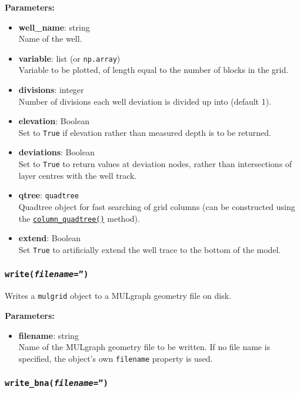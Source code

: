 \textbf{Parameters:}
\begin{itemize}
\item \textbf{well\_name}: string\\
  Name of the well.
\item \textbf{variable}: list (or \texttt{np.array})\\
  Variable to be plotted, of length equal to the number of blocks in the grid.
\item \textbf{divisions}: integer\\
  Number of divisions each well deviation is divided up into (default 1).
\item \textbf{elevation}: Boolean\\
  Set to \texttt{True} if elevation rather than measured depth is to be returned.
\item \textbf{deviations}: Boolean\\
  Set to \texttt{True} to return values at deviation nodes, rather than intersections of layer centres with the well track.
\item \textbf{qtree}: \texttt{quadtree}\\
  Quadtree object for fast searching of grid columns (can be constructed using the \hyperref[sec:mulgrid:column_quadtree]{\texttt{column\_quadtree()}} method).
\item \textbf{extend}: Boolean\\
  Set \texttt{True} to artificially extend the well trace to the bottom of the model.
\end{itemize}

\begin{snugshade}\subsubsection{\texttt{write(\emph{filename}='')}}\end{snugshade}
\label{sec:mulgrid:write}

Writes a \texttt{mulgrid} object to a MULgraph geometry file on disk.

\textbf{Parameters:}
\begin{itemize}
\item \textbf{filename}: string\\
  Name of the MULgraph geometry file to be written.  If no file name is specified, the object's own \texttt{filename} property is used.
\end{itemize}

\begin{snugshade}\subsubsection{\texttt{write\_bna(\emph{filename}='')}}\end{snugshade}
\label{sec:mulgrid:write_bna}


